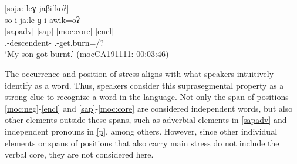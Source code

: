 \documentclass[output=paper]{langscibook}
\begin{document}
\ea \label{ex:stressencl}
 [soja:ˈleɣ jaβiˈkoʔ]\\
\glll so i-jaːle-ɡ i-awik=oʔ\\
\ref{sapadv} {} \ref{sap}-\ref{moc:core}-\ref{encl}\\
{\DetTwo} {\First\Sg.\Poss}-descendent-{\M} {\Third.\I}-get.burn={\Evid/\Tprl}?\\
\glt `My son got burnt.' \hfill(mocCA191111: 00:03:46)
\z





 The occurrence and position of stress aligns with what speakers intuitively identify as a word. Thus, speakers consider this suprasegmental property as a strong clue to recognize a word in the language. Not only the span of positions \ref{moc:neg}-\ref{encl} and \ref{sap}-\ref{moc:core} are considered independent words, but also other elements outside these spans, such as adverbial elements in \ref{sapadv} and independent pronouns in \ref{p}, among others. However, since other individual elements or spans of positions that also carry main stress do not include the verbal core, they are not considered here.
\end{document}
